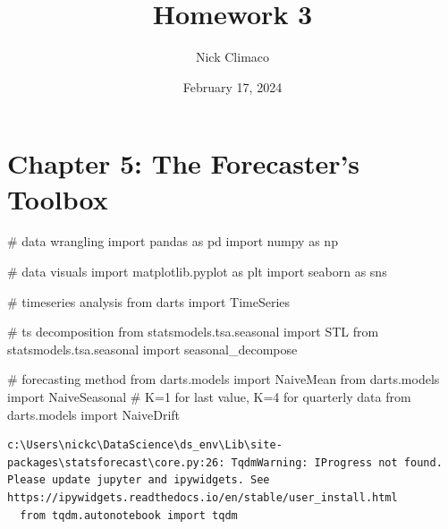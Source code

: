 \documentclass[
  11pt,
]{article}
\title{Homework 3}
\author{Nick Climaco}
\date{February 17, 2024}
\newenvironment{Shaded}{\begin{snugshade}}{\end{snugshade}}
\newcommand{\CommentTok}[1]{\textcolor[rgb]{0.37,0.37,0.37}{#1}}
\newcommand{\ImportTok}[1]{\textcolor[rgb]{0.00,0.46,0.62}{#1}}
\newcommand{\NormalTok}[1]{\textcolor[rgb]{0.00,0.23,0.31}{#1}}
\renewcommand*\contentsname{Table of contents}
\newcommand\contentsname{Table of contents}
\begin{document}
\maketitle


\renewcommand*\contentsname{Table of contents}
{
\hypersetup{linkcolor=}
\setcounter{tocdepth}{3}
\tableofcontents
}
\newpage

\section{Chapter 5: The Forecaster's
Toolbox}\label{chapter-5-the-forecasters-toolbox}

\begin{Shaded}
\begin{Highlighting}[]
\CommentTok{\# data wrangling }
\ImportTok{import}\NormalTok{ pandas }\ImportTok{as}\NormalTok{ pd }
\ImportTok{import}\NormalTok{ numpy }\ImportTok{as}\NormalTok{ np}

\CommentTok{\# data visuals}
\ImportTok{import}\NormalTok{ matplotlib.pyplot }\ImportTok{as}\NormalTok{ plt }
\ImportTok{import}\NormalTok{ seaborn }\ImportTok{as}\NormalTok{ sns}

\CommentTok{\# timeseries analysis}
\ImportTok{from}\NormalTok{ darts }\ImportTok{import}\NormalTok{ TimeSeries}

\CommentTok{\# ts decomposition}
\ImportTok{from}\NormalTok{ statsmodels.tsa.seasonal }\ImportTok{import}\NormalTok{ STL}
\ImportTok{from}\NormalTok{ statsmodels.tsa.seasonal }\ImportTok{import}\NormalTok{ seasonal\_decompose}

\CommentTok{\# forecasting method}
\ImportTok{from}\NormalTok{ darts.models }\ImportTok{import}\NormalTok{ NaiveMean}
\ImportTok{from}\NormalTok{ darts.models }\ImportTok{import}\NormalTok{ NaiveSeasonal }\CommentTok{\# K=1 for last value, K=4 for quarterly data}
\ImportTok{from}\NormalTok{ darts.models }\ImportTok{import}\NormalTok{ NaiveDrift}
\end{Highlighting}
\end{Shaded}

\begin{verbatim}
c:\Users\nickc\DataScience\ds_env\Lib\site-packages\statsforecast\core.py:26: TqdmWarning: IProgress not found. Please update jupyter and ipywidgets. See https://ipywidgets.readthedocs.io/en/stable/user_install.html
  from tqdm.autonotebook import tqdm
\end{verbatim}
\end{document}

